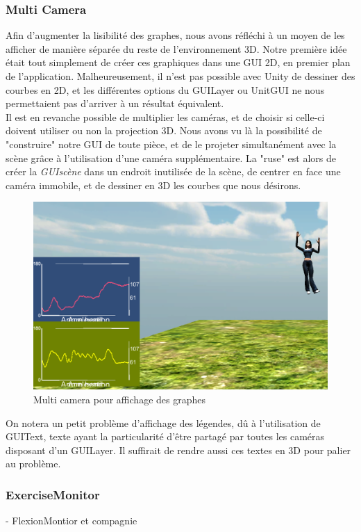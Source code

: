 \documentclass[french,12pt]{report}
\begin{document}
		\subsubsection{Multi Camera}
Afin d'augmenter la lisibilité des graphes, nous avons réfléchi à un moyen de les afficher de manière séparée du reste de
l'environnement 3D. Notre première idée était tout simplement de créer ces graphiques dans une GUI 2D, en premier
plan de l'application. Malheureusement, il n'est pas possible avec Unity de dessiner des courbes en 2D, et les différentes
options du GUILayer ou UnitGUI ne nous permettaient pas d'arriver à un résultat équivalent.\\
Il est en revanche possible de multiplier les caméras, et de choisir si celle-ci doivent utiliser ou non la projection 3D. Nous 
avons vu là la possibilité de "construire" notre GUI de toute pièce, et de le projeter simultanément avec la scène grâce à
l'utilisation d'une caméra supplémentaire. La "ruse" est alors de créer la  \textit{GUIscène} dans un endroit inutilisée de la 
scène, de centrer en face une caméra immobile, et de dessiner en 3D les courbes que nous désirons.
\begin{figure}
\begin{center}
	\includegraphics[scale=0.5]{images/multicamera.png} \caption{Multi camera pour affichage des graphes}
	\end{center}
\end{figure}
 On notera un petit problème d'affichage des légendes, dû à l'utilisation de GUIText, texte ayant la particularité d'être partagé par toutes les 
caméras disposant d'un GUILayer. Il suffirait de rendre aussi ces textes en 3D pour palier au problème.

		
		\subsubsection{ExerciseMonitor}
		- FlexionMontior et compagnie
		
\end{document}
